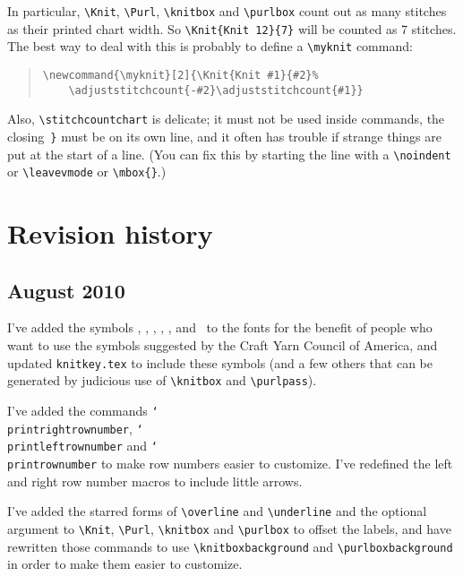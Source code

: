 \documentclass[draft]{amsart}
\begin{document}
In particular, \verb|\Knit|, \verb|\Purl|, \verb|\knitbox| and \verb|\purlbox| count out as many stitches as their printed chart width. So \verb|\Knit{Knit 12}{7}|  will be counted as 7 stitches. The best way to deal with this is probably to define a \verb|\myknit| command:
\begin{quote}
\verb?\newcommand{\myknit}[2]{\Knit{Knit #1}{#2}%?\\
\verb?    \adjuststitchcount{-#2}\adjuststitchcount{#1}}?
\end{quote}

Also, \verb|\stitchcountchart| is delicate; it must not be used inside commands, the closing~\verb|}| must be on its own line, and it often has trouble if strange things are put at the start of a line. (You can fix this by starting the line with a \verb|\noindent| or \verb|\leavevmode| or \verb|\mbox{}|.)

\section{Revision history}

\subsection*{August 2010}

I've added the symbols \textknit{(}, \textknit{)}, , , , and~ to the fonts for the benefit of people who want to use the symbols suggested by the Craft Yarn Council of America, and updated \texttt{knitkey.tex} to include these symbols (and a few others that can be generated by judicious use of \verb|\knitbox| and \verb|\purlpass|).

I've added the commands \texttt{\char`\\ print\-rightrownumber}, \texttt{\char`\\ printleftrownumber} and \texttt{\char`\\ print\-row\-number} to make row numbers easier to customize. I've redefined the left and right row number macros to include little arrows.

I've added the starred forms of \verb|\overline| and \verb|\underline| and the optional argument to \verb|\Knit|, \verb|\Purl|, \verb|\knitbox| and \verb|\purlbox| to offset the labels, and have rewritten those commands to use \verb|\knitboxbackground| and \verb|\purlboxbackground| in order to make them easier to customize.
\end{document}

